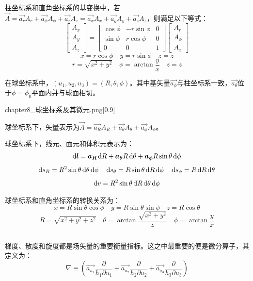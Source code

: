 柱坐标系和直角坐标系的基变换中，若$\vec{A} = \vec{a_r}A_r + \vec{a_\phi}A_\phi + \vec{a_z}A_z = \vec{a_x}A_x + \vec{a_y}A_y + \vec{a_z}A_z$，则满足以下等式：
\begin{equation*}
    \begin{bmatrix}
        A_x \\
        A_y \\
        A_z
    \end{bmatrix}
    =
    \begin{bmatrix}
        \cos\phi & -r\sin\phi & 0 \\
        \sin\phi & r\cos\phi & 0 \\
        0 & 0 & 1
    \end{bmatrix}
    \begin{bmatrix}
        A_r \\
        A_\phi \\
        A_z
    \end{bmatrix}
\end{equation*}
\[x = r\cos\phi\quad y = r\sin\phi\quad z = z\]
\[r = \sqrt{x^2 + y^2}\quad \phi = \arctan\dfrac{y}{x}\quad z = z\]

在球坐标系中，$(u_1, u_2, u_3) = (R,\theta,\phi)$。其中基矢量$\vec{a_\phi}$与柱坐标系一致，$\vec{a_\theta}$位于$\phi = \phi_0$平面内并与球面相切。
\begin{singlefigure}[球坐标系及其微元]{chapter8_球坐标系及其微元.png}[0.9]
\end{singlefigure}

球坐标系下，矢量表示为$\vec{A} = \vec{a_R}A_R + \vec{a_\theta}A_\theta + \vec{a_\phi}A_\phi$。

球坐标系下，线元、面元和体积元表示为：
\[\dif \vec{l} = \vec{a_R}\dif R + \vec{a_\theta}R\dif \theta + \vec{a_\phi}R\sin\theta\dif \phi\]
\[\dif s_R = R^2\sin\theta\dif \theta\dif \phi\quad \dif s_\theta = R\sin\theta\dif R\dif \phi\quad \dif s_\phi = R\dif R\dif \theta\]
\[\dif v = R^2\sin\theta\dif R\dif \theta\dif \phi\]

球坐标系和直角坐标系的转换关系为：
\[x = R\sin\theta\cos\phi\quad y = R\sin\theta\sin\phi\quad z = R\cos\theta\]
\[R = \sqrt{x^2+y^2+z^2}\quad \theta = \arctan\dfrac{\sqrt{x^2+y^2}}{z}\quad \phi = \arctan\dfrac{y}{x}\]
\subsection[梯度、散度、旋度]{}
梯度、散度和旋度都是场矢量的重要衡量指标。这之中最重要的便是微分算子，其定义为：
\[\nabla \equiv (\vec{a_{u_1}}\dfrac{\partial}{h_1\partial u_1} + \vec{a_{u_2}}\dfrac{\partial}{h_2\partial u_2} + \vec{a_{u_3}}\dfrac{\partial}{h_3\partial u_3})\]

